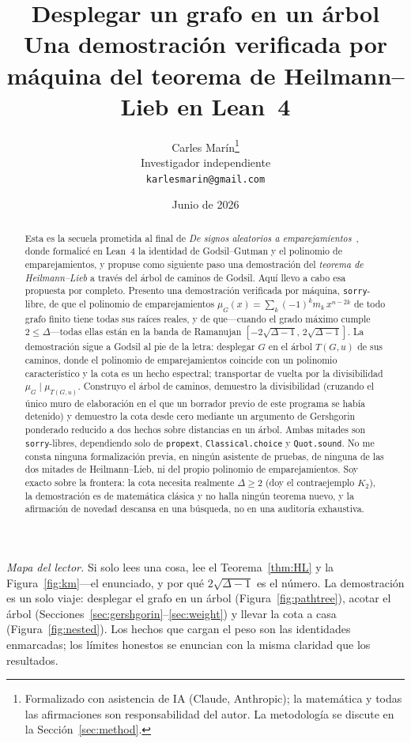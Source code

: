 \documentclass[11pt]{article}
\title{\bf Desplegar un grafo en un \'arbol\\[4pt]
  \large\normalfont Una demostraci\'on verificada por m\'aquina del teorema de Heilmann--Lieb en Lean~4}
\author{Carles Mar\'in\thanks{Formalizado con asistencia de IA (Claude, Anthropic); la matem\'atica y todas las afirmaciones son responsabilidad del autor. La metodolog\'ia se discute en la Secci\'on~\ref{sec:method}.}\\[3pt]
  \normalsize Investigador independiente\\
  \normalsize \texttt{karlesmarin@gmail.com}}
\date{Junio de 2026}
\newcommand{\lean}[1]{{\def\_{\textunderscore\allowbreak}\texttt{#1}}}
\begin{document}
\maketitle

\begin{abstract}
Esta es la secuela prometida al final de \emph{De signos aleatorios a
emparejamientos}~\cite{PartI}, donde formalic\'e en Lean~4 la identidad de
Godsil--Gutman y el polinomio de emparejamientos, y propuse como siguiente paso una
demostraci\'on del \emph{teorema de Heilmann--Lieb} a trav\'es del \'arbol de
caminos de Godsil. Aqu\'i llevo a cabo esa propuesta por completo. Presento una
demostraci\'on verificada por m\'aquina, \lean{sorry}-libre, de que el polinomio de
emparejamientos $\mu_G(x)=\sum_k(-1)^k m_k\,x^{n-2k}$ de todo grafo finito tiene
todas sus ra\'ices reales, y de que---cuando el grado m\'aximo cumple
$2\le\Delta$---todas ellas est\'an en la banda de Ramanujan
$[-2\sqrt{\Delta-1},\,2\sqrt{\Delta-1}]$. La demostraci\'on sigue a Godsil al pie de
la letra: desplegar $G$ en el \'arbol $T(G,u)$ de sus caminos, donde el polinomio de
emparejamientos coincide con un polinomio caracter\'istico y la cota es un hecho
espectral; transportar de vuelta por la divisibilidad $\mu_G\mid\mu_{T(G,u)}$.
Construyo el \'arbol de caminos, demuestro la divisibilidad (cruzando el \'unico
muro de elaboraci\'on en el que un borrador previo de este programa se hab\'ia
detenido) y demuestro la cota desde cero mediante un argumento de Gershgorin
ponderado reducido a dos hechos sobre distancias en un \'arbol. Ambas mitades son
\lean{sorry}-libres, dependiendo solo de \lean{propext}, \lean{Classical.choice} y
\lean{Quot.sound}. No me consta ninguna formalizaci\'on previa, en ning\'un
asistente de pruebas, de ninguna de las dos mitades de Heilmann--Lieb, ni del propio
polinomio de emparejamientos. Soy exacto sobre la frontera: la cota
necesita realmente $\Delta\ge2$ (doy el contraejemplo $K_2$), la demostraci\'on es
de matem\'atica cl\'asica y no halla ning\'un teorema nuevo, y la afirmaci\'on de
novedad descansa en una b\'usqueda, no en una auditor\'ia exhaustiva.
\end{abstract}

\noindent\emph{Mapa del lector.} Si solo lees una cosa, lee el
Teorema~\ref{thm:HL} y la Figura~\ref{fig:km}---el enunciado, y por qu\'e
$2\sqrt{\Delta-1}$ es el n\'umero. La demostraci\'on es un solo viaje: desplegar el
grafo en un \'arbol (Figura~\ref{fig:pathtree}), acotar el \'arbol
(Secciones~\ref{sec:gershgorin}--\ref{sec:weight}) y llevar la cota a casa
(Figura~\ref{fig:nested}). Los hechos que cargan el peso son las identidades
enmarcadas; los l\'imites honestos se enuncian con la misma claridad que los
resultados.
\end{document}
